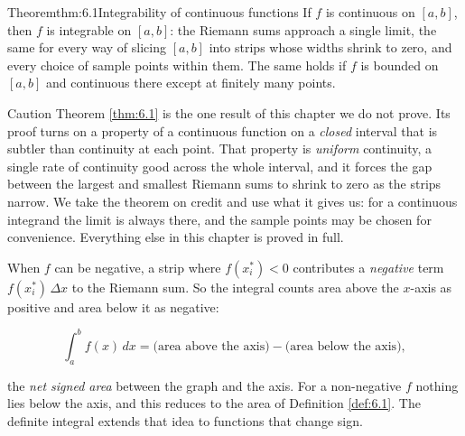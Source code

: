 \documentclass[a4paper,12pt,oneside]{memoir}
\begin{document}
\begin{envtheorem}{Theorem}{thm:6.1}{Integrability of continuous functions}
If \(f\) is continuous on \([a, b]\), then \(f\) is integrable on \([a, b]\): the Riemann sums approach a single limit, the same for every way of slicing \([a, b]\) into strips whose widths shrink to zero, and every choice of sample points within them. The same holds if \(f\) is bounded on \([a, b]\) and continuous there except at finitely many points.
\end{envtheorem}
\begin{envcaution}{Caution}{}{}
Theorem \ref{thm:6.1} is the one result of this chapter we do not prove. Its proof turns on a property of a continuous function on a \emph{closed} interval that is subtler than continuity at each point. That property is \emph{uniform} continuity, a single rate of continuity good across the whole interval, and it forces the gap between the largest and smallest Riemann sums to shrink to zero as the strips narrow. We take the theorem on credit and use what it gives us: for a continuous integrand the limit is always there, and the sample points may be chosen for convenience. Everything else in this chapter is proved in full.
\end{envcaution}
When \(f\) can be negative, a strip where \(f(x_{i}^{*}) < 0\) contributes a \emph{negative} term \(f(x_{i}^{*})\,\Delta x\) to the Riemann sum. So the integral counts area above the \(x\)-axis as positive and area below it as negative:

\[ \int_{a}^{b} f(x)\,dx = \bigl(\text{area above the axis}\bigr) - \bigl(\text{area below the axis}\bigr), \]

the \emph{net signed area} between the graph and the axis. For a non-negative \(f\) nothing lies below the axis, and this reduces to the area of Definition \ref{def:6.1}. The definite integral extends that idea to functions that change sign.
\end{document}
